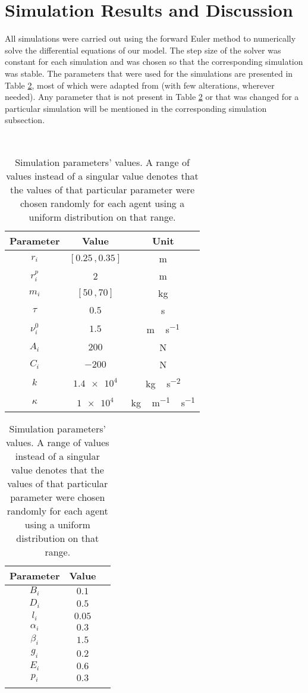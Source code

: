 \section{Simulation Results and Discussion}
All simulations were carried out using the forward Euler method to numerically solve the differential equations of our model. The step size of the solver was constant for each simulation and was chosen so that the corresponding simulation was stable. The parameters that were used for the simulations are presented in Table \ref{tab:param}, most of which were adapted from \cite{Wang2016} (with few alterations, wherever needed). Any parameter that is not present in Table \ref{tab:param} or that was changed for a particular simulation will be mentioned in the corresponding simulation subsection.

\begin{table}[ht]
	\, \hfill
	\begin{tabular}{c c c}
		\hline
		Parameter & Value & Unit \\ \hline
		$r_i$ & $[0.25 \,, 0.35]$ & \si{\meter} \\
		$r_i^p$ & 2 & \si{\meter} \\
		$m_i$ & $[50 \,, 70]$ & \si{\kilogram} \\
		$\tau$ & $0.5$ & \si{\second} \\
		$\nu_i^0$ & $1.5$ & \si{\meter\,\second^{-1}} \\
		$A_i$ & $200$ & \si{\newton} \\
		$C_i$ & $-200$ & \si{\newton} \\
		$k$ & $\num{1.4e4}$ & \si{\kilogram\,\second^{-2}} \\
		$\kappa$ & $\num{1e4}$ & \si{\kilogram\,\meter^{-1}\,\second^{-1}} \\
	\end{tabular}
	\hfill
	\begin{tabular}{c c c}
		\hline
		Parameter & Value & \\ \hline
		$B_i$ & $0.1$ &  \\
		$D_i$ & $0.5$ &  \\
		$l_i$ & $0.05$ &  \\
		$\alpha_i$ & $0.3$ &  \\
		$\beta_i$ & $1.5$ &  \\
		$g_i$ & $0.2$ &  \\
		$E_i$ & $0.6$ &  \\
		$p_i$ & $0.3$ &  \\
		 & & \\
	\end{tabular}
	\hfill \,
	\caption{Simulation parameters' values. A range of values instead of a singular value denotes that the values of that particular parameter were chosen randomly for each agent using a uniform distribution on that range.}
	\label{tab:param}
\end{table}


